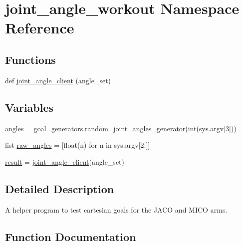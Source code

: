 \hypertarget{namespacejoint__angle__workout}{}\section{joint\+\_\+angle\+\_\+workout Namespace Reference}
\label{namespacejoint__angle__workout}
\subsection*{Functions}
\begin{DoxyCompactItemize}
\item 
def \hyperlink{namespacejoint__angle__workout_a8574a355a0a9e85d1767e15c49cb052e}{joint\+\_\+angle\+\_\+client} (angle\+\_\+set)
\end{DoxyCompactItemize}
\subsection*{Variables}
\begin{DoxyCompactItemize}
\item 
\hyperlink{namespacejoint__angle__workout_a44cb6da34666d45961b26233ed5264bf}{angles} = \hyperlink{namespacegoal__generators_a6ab109de507bd107dedc7801ca7c5381}{goal\+\_\+generators.\+random\+\_\+joint\+\_\+angles\+\_\+generator}(int(sys.\+argv\mbox{[}3\mbox{]}))
\item 
list \hyperlink{namespacejoint__angle__workout_a2c310c9dff3a6e145dc3474b7c751546}{raw\+\_\+angles} = \mbox{[}float(n) for n in sys.\+argv\mbox{[}2\+:\mbox{]}\mbox{]}
\item 
\hyperlink{namespacejoint__angle__workout_ad8129235290985797e7512a9f73bdaf4}{result} = \hyperlink{namespacejoint__angle__workout_a8574a355a0a9e85d1767e15c49cb052e}{joint\+\_\+angle\+\_\+client}(angle\+\_\+set)
\end{DoxyCompactItemize}


\subsection{Detailed Description}
\begin{DoxyVerb}A helper program to test cartesian goals for the JACO and MICO arms.\end{DoxyVerb}
 

\subsection{Function Documentation}
